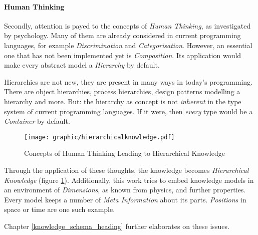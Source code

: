 %
%
%
%
%
%
%

\paragraph{Human Thinking}
\label{thinking_heading}

Secondly, attention is payed to the concepts of \emph{Human Thinking}, as
investigated by psychology. Many of them are already considered in current
programming languages, for example \emph{Discrimination} and \emph{Categorisation}.
However, an essential one that has not been implemented yet is \emph{Composition}.
Its application would make every abstract model a \emph{Hierarchy} by default.

Hierarchies are not new, they are present in many ways in today's programming.
There are object hierarchies, process hierarchies, design patterns modelling a
hierarchy and more. But: the hierarchy as concept is not \emph{inherent} in the
type system of current programming languages. If it were, then \emph{every}
type would be a \emph{Container} by default.

\begin{figure}[ht]
    \begin{center}
        \texttt{[image: graphic/hierarchicalknowledge.pdf]}
        \caption{Concepts of Human Thinking Leading to Hierarchical Knowledge}
        \label{hierarchicalknowledge_figure}
    \end{center}
\end{figure}

Through the application of these thoughts, the knowledge becomes
\emph{Hierarchical Knowledge} (figure \ref{hierarchicalknowledge_figure}).
Additionally, this work tries to embed knowledge models in an environment of
\emph{Dimensions}, as known from physics, and further properties. Every model
keeps a number of \emph{Meta Information} about its parts. \emph{Positions} in
space or time are one such example.

Chapter \ref{knowledge_schema_heading} further elaborates on these issues.
